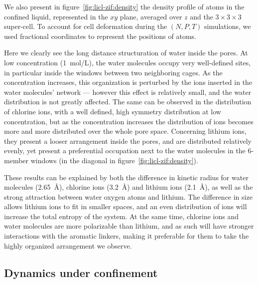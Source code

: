 \documentclass[thesis]{subfiles}
\begin{document}
We also present in figure~\ref{fig:licl-zif:density} the density profile of atoms in the
confined liquid, represented in the $xy$ plane, averaged over $z$ and the
$3\times3\times3$ super-cell. To account for cell deformation during the $(N, P, T)$
simulations, we used fractional coordinates to represent the positions of atoms.

Here we clearly see the long distance structuration of water inside the 
pores. At low concentration (\SI{1}{mol/L}), the water molecules occupy very
well-defined sites, in particular inside the windows between two neighboring
cages. As the concentration increases, this organization is perturbed by the
ions inserted in the water molecules' network --- however this effect is
relatively small, and the water distribution is not greatly affected. The same
can be observed in the distribution of chlorine ions, with a well defined, high
symmetry distribution at low concentration, but as the concentration increases
the distribution of ions becomes more and more distributed over the whole pore
space. Concerning lithium ions, they present a looser arrangement inside the
pores, and are distributed relatively evenly, yet present a preferential
occupation next to the water molecules in the 6-member windows (in the diagonal
in figure~\ref{fig:licl-zif:density}).

These results can be explained by both the difference in kinetic
radius\cite{Marcus1988} for water molecules (\SI{2.65}{\angstrom}), chlorine
ions (\SI{3.2}{\angstrom}) and lithium ions (\SI{2.1}{\angstrom}), as well as
the strong attraction between water oxygen atoms and lithium. The difference in
size allows lithium ions to fit in smaller spaces, and an even distribution of
ions will increase the total entropy of the system. At the same time, chlorine
ions and water molecules are more polarizable than lithium, and as such will
have stronger interactions with the aromatic linkers, making it preferable for
them to take the highly organized arrangement we observe.

\subsection{Dynamics under confinement}
\end{document}
